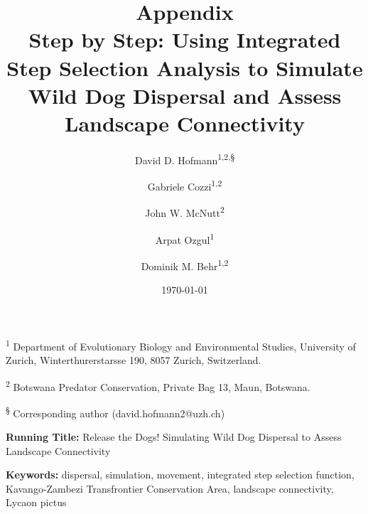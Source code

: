\documentclass[abstract=off,10pt,a4paper,bibliography=totocnumbered]{article}
\title{\textbf{Appendix}\\ Step by Step: Using Integrated Step Selection
Analysis to Simulate Wild Dog Dispersal and Assess Landscape Connectivity}
\author{
  David D. Hofmann\textsuperscript{1,2,\S} \and
  Gabriele Cozzi\textsuperscript{1,2} \and
  John W. McNutt\textsuperscript{2} \and
  Arpat Ozgul\textsuperscript{1} \and
  Dominik M. Behr\textsuperscript{1,2}
}
\date{\today}
\newcommand{\beginappendix}{%
  \setcounter{table}{0}
  \renewcommand{\thetable}{S\arabic{table}}%
  \setcounter{figure}{0}
  \renewcommand{\thefigure}{S\arabic{figure}}%
  \setcounter{equation}{0}
  \renewcommand{\theequation}{Equation S\arabic{equation}}%
  \setcounter{section}{0}
  \renewcommand{\thesection}{A.\arabic{section}}%
}
\begin{document}



\maketitle

\begin{flushleft}

\vspace{0.5cm}

\textsuperscript{1} Department of Evolutionary Biology and Environmental
Studies, University of Zurich, Winterthurerstarsse 190, 8057 Zurich,
Switzerland.

\textsuperscript{2} Botswana Predator Conservation, Private Bag 13, Maun,
Botswana.

\textsuperscript{\S} Corresponding author (david.hofmann2@uzh.ch)

\vspace{4cm}

\textbf{Running Title:} Release the Dogs! Simulating Wild Dog Dispersal to
Assess Landscape Connectivity

\vspace{0.5cm}

\textbf{Keywords:} dispersal, simulation, movement, integrated step selection
function, Kavango-Zambezi Transfrontier Conservation Area, landscape
connectivity, Lycaon pictus

\end{flushleft}

\newpage



\appendix
\beginappendix

\newpage
\end{document}
